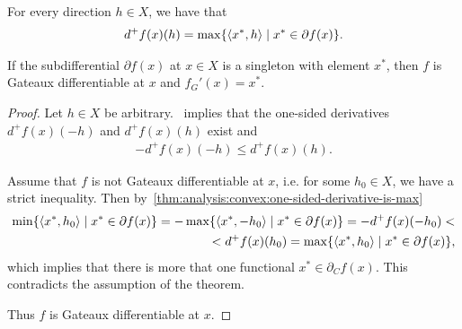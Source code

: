 \begin{proposition}
  \label{thm:analysis:convex:one-sided-derivative-is-max}
  For every direction $h \in X$, we have that
  \begin{align*}
    d^+ f(x)(h) = \max\{ \left\langle x^*, h \right\rangle \mid x^* \in \partial f(x) \}.
  \end{align*}
\end{proposition}

\begin{theorem}
  \label{thm:analysis:convex:singleton-subdifferential-implies-gateaux}
  If the subdifferential $\partial f(x)$ at $x \in X$ is a singleton with element $x^*$, then $f$ is Gateaux differentiable at $x$ and $f_G'(x) = x^*$.
\end{theorem}
\begin{proof}
  Let $h \in X$ be arbitrary.~ implies that the one-sided derivatives $d^+ f(x)(-h)$ and $d^+ f(x)(h)$ exist and
  \begin{align*}
    -d^+ f(x)(-h) \leq d^+ f(x)(h).
  \end{align*}

  Assume that $f$ is not Gateaux differentiable at $x$, i.e. for some $h_0 \in X$, we have a strict inequality. Then by~\cref{thm:analysis:convex:one-sided-derivative-is-max}
  \begin{align*}
    \min\{ \left\langle x^*, h_0 \right\rangle \mid x^* \in \partial f(x) \}
    =
    -\max\{ \left\langle x^*, -h_0 \right\rangle \mid x^* \in \partial f(x) \}
    =
    -d^+ f(x)(-h_0)
    < \\ <
    d^+ f(x)(h_0)
    =
    \max\{ \left\langle x^*, h_0 \right\rangle \mid x^* \in \partial f(x) \},
  \end{align*}
  which implies that there is more that one functional $x^* \in \partial_C f(x)$. This contradicts the assumption of the theorem.

  Thus $f$ is Gateaux differentiable at $x$.
\end{proof}
